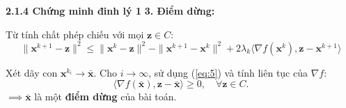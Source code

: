 \begin{frame}{\textbf{\large 2.1.4 Chứng minh đinh lý 1}}
    \vspace*{-1cm}
    \textbf{3. Điểm dừng: }
    
    Từ tính chất phép chiếu với mọi $\mathbf{z} \in C$:
    \begin{equation} \label{eq:6}
        \|\mathbf{x}^{k+1} - \mathbf{z}\|^2 \le \|\mathbf{x}^k - \mathbf{z}\|^2 - \|\mathbf{x}^{k+1} - \mathbf{x}^k\|^2 + 2\lambda_k \langle \nabla f(\mathbf{x}^k), \mathbf{z} - \mathbf{x}^{k+1} \rangle
    \end{equation}
    
    Xét dãy con $\mathbf{x}^{k_i} \to \bar{\mathbf{x}}$. Cho $i \to \infty$, sử dụng (\ref{eq:5}) và tính liên tục của $\nabla f$:
    \begin{equation}
         \langle \nabla f(\bar{\mathbf{x}}), \mathbf{z} - \bar{\mathbf{x}} \rangle \ge 0, \quad \forall \mathbf{z} \in C.
    \end{equation}
    $\implies \bar{\mathbf{x}}$ là một \textbf{điểm dừng} của bài toán.
\end{frame}


